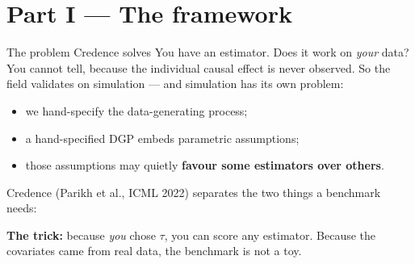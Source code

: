 \documentclass[aspectratio=169]{beamer}
\begin{document}
\section{Part I --- The framework}

\begin{frame}{The problem Credence solves}
  \small
  You have an estimator. Does it work on \emph{your} data? You cannot tell, because
  the individual causal effect is never observed. So the field validates on
  simulation --- and simulation has its own problem:

  \begin{itemize}
    \item we hand-specify the data-generating process;
    \item a hand-specified DGP embeds parametric assumptions;
    \item those assumptions may quietly \textbf{favour some estimators over others}.
  \end{itemize}

  Credence (Parikh et al., ICML 2022) separates the two things a benchmark needs:

  \begin{center}
  \end{center}

  \vspace{0.3em}
  \textcolor{accent}{\textbf{The trick:}} because \emph{you} chose $\tau$, you can score
  any estimator. Because the covariates came from real data, the benchmark is not a
  toy.
\end{frame}
\end{document}
